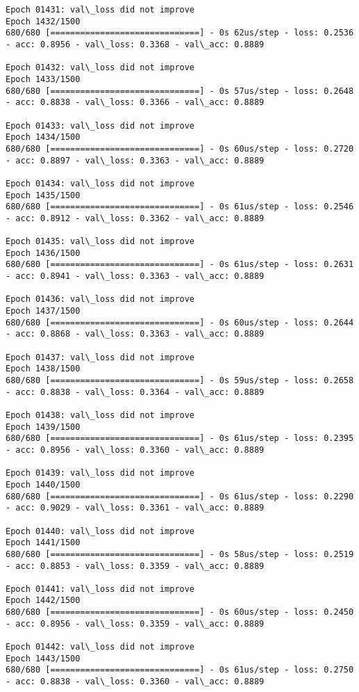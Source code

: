 \documentclass[11pt]{article}
\begin{document}
\begin{Verbatim}[commandchars=\\\{\}]
Epoch 01431: val\_loss did not improve
Epoch 1432/1500
680/680 [==============================] - 0s 62us/step - loss: 0.2536 - acc: 0.8956 - val\_loss: 0.3368 - val\_acc: 0.8889

Epoch 01432: val\_loss did not improve
Epoch 1433/1500
680/680 [==============================] - 0s 57us/step - loss: 0.2648 - acc: 0.8838 - val\_loss: 0.3366 - val\_acc: 0.8889

Epoch 01433: val\_loss did not improve
Epoch 1434/1500
680/680 [==============================] - 0s 60us/step - loss: 0.2720 - acc: 0.8897 - val\_loss: 0.3363 - val\_acc: 0.8889

Epoch 01434: val\_loss did not improve
Epoch 1435/1500
680/680 [==============================] - 0s 61us/step - loss: 0.2546 - acc: 0.8912 - val\_loss: 0.3362 - val\_acc: 0.8889

Epoch 01435: val\_loss did not improve
Epoch 1436/1500
680/680 [==============================] - 0s 61us/step - loss: 0.2631 - acc: 0.8941 - val\_loss: 0.3363 - val\_acc: 0.8889

Epoch 01436: val\_loss did not improve
Epoch 1437/1500
680/680 [==============================] - 0s 60us/step - loss: 0.2644 - acc: 0.8868 - val\_loss: 0.3363 - val\_acc: 0.8889

Epoch 01437: val\_loss did not improve
Epoch 1438/1500
680/680 [==============================] - 0s 59us/step - loss: 0.2658 - acc: 0.8838 - val\_loss: 0.3364 - val\_acc: 0.8889

Epoch 01438: val\_loss did not improve
Epoch 1439/1500
680/680 [==============================] - 0s 61us/step - loss: 0.2395 - acc: 0.8956 - val\_loss: 0.3360 - val\_acc: 0.8889

Epoch 01439: val\_loss did not improve
Epoch 1440/1500
680/680 [==============================] - 0s 61us/step - loss: 0.2290 - acc: 0.9029 - val\_loss: 0.3361 - val\_acc: 0.8889

Epoch 01440: val\_loss did not improve
Epoch 1441/1500
680/680 [==============================] - 0s 58us/step - loss: 0.2519 - acc: 0.8853 - val\_loss: 0.3359 - val\_acc: 0.8889

Epoch 01441: val\_loss did not improve
Epoch 1442/1500
680/680 [==============================] - 0s 60us/step - loss: 0.2450 - acc: 0.8956 - val\_loss: 0.3359 - val\_acc: 0.8889

Epoch 01442: val\_loss did not improve
Epoch 1443/1500
680/680 [==============================] - 0s 61us/step - loss: 0.2750 - acc: 0.8838 - val\_loss: 0.3360 - val\_acc: 0.8889


\end{Verbatim}
\end{document}
